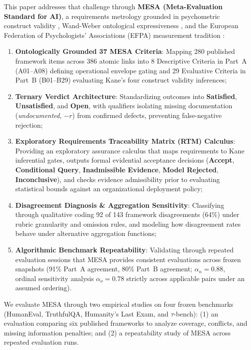 \documentclass[runningheads]{llncs}
\begin{document}
This paper addresses that challenge through \textbf{MESA (Meta-Evaluation Standard for AI)}, a requirements metrology grounded in psychometric construct validity \cite{kane_validation,aera_apa_ncme_standards_2014}, Wand-Weber ontological expressiveness \cite{wand_weber_1993}, and the European Federation of Psychologists' Associations (EFPA) measurement tradition \cite{efpa_test_review_model_2025}:
\begin{enumerate}[leftmargin=*]
    \item \textbf{Ontologically Grounded 37 MESA Criteria}: Mapping 280 published framework items across 386 atomic links into 8 Descriptive Criteria in Part~A (A01--A08) defining operational envelope gating and 29 Evaluative Criteria in Part~B (B01--B29) evaluating Kane's four construct validity inferences;
    \item \textbf{Ternary Verdict Architecture}: Standardizing outcomes into \textbf{Satisfied}, \textbf{Unsatisfied}, and \textbf{Open}, with qualifiers isolating missing documentation (\emph{undocumented}, $-r$) from confirmed defects, preventing false-negative rejection;
    \item \textbf{Exploratory Requirements Traceability Matrix (RTM) Calculus}: Providing an exploratory assurance calculus that maps requirements to Kane inferential gates, outputs formal evidential acceptance decisions (\textbf{Accept}, \textbf{Conditional Query}, \textbf{Inadmissible Evidence}, \textbf{Model Rejected}, \textbf{Inconclusive}), and checks evidence admissibility prior to evaluating statistical bounds against an organizational deployment policy;
    \item \textbf{Disagreement Diagnosis \& Aggregation Sensitivity}: Classifying through qualitative coding 92 of 143 framework disagreements (64\%) under rubric granularity and omission rules, and modeling how disagreement rates behave under alternative aggregation functions;
    \item \textbf{Algorithmic Benchmark Repeatability}: Validating through repeated evaluation sessions that MESA provides consistent evaluations across frozen snapshots (91\% Part~A agreement, 80\% Part~B agreement; $\alpha_n = 0.88$, ordinal sensitivity analysis $\alpha_o = 0.78$ strictly across applicable pairs under an assumed ordering).
\end{enumerate}

We evaluate MESA through two empirical studies on four frozen benchmarks (HumanEval, TruthfulQA, Humanity's Last Exam, and $\tau$-bench): (1) an evaluation comparing six published frameworks to analyze coverage, conflicts, and missing information penalties; and (2) a repeatability study of MESA across repeated evaluation runs.
\end{document}
